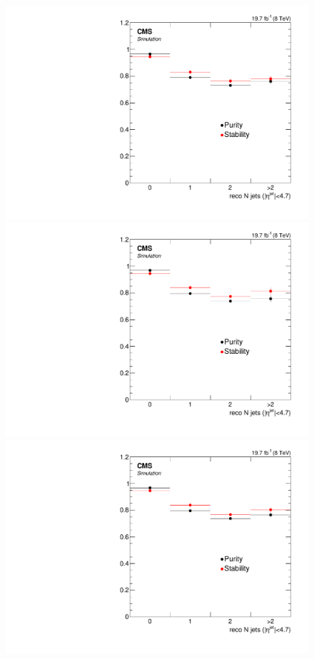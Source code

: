 \begin{figure}[hbtp]
  \begin{center}
    \includegraphics[width=0.8\cmsFigWidth]{Figures/Unfolding/BinMigration/PurityStability_4m_Jets_Mad}
    \includegraphics[width=0.8\cmsFigWidth]{Figures/Unfolding/BinMigration/PurityStability_4e_Jets_Mad}
    \includegraphics[width=0.8\cmsFigWidth]{Figures/Unfolding/BinMigration/PurityStability_2e2m_Jets_Mad}

\end{center}
\end{figure}
